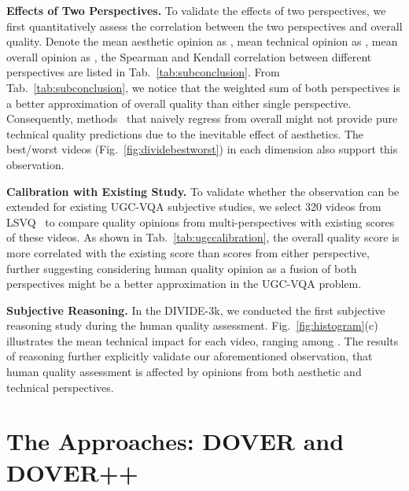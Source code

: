 \documentclass[10pt,twocolumn,letterpaper]{article}
\renewcommand{\paragraph}[1]{\noindent \textbf{#1}}
\newcommand{\blue}[1]{\textbf{\textcolor{mblue}{#1}}}
\newcommand{\green}[1]{\textcolor{mgreen}{#1}}
\begin{document}
\paragraph{Effects of Two Perspectives.} To validate the effects of two perspectives, we first quantitatively assess the correlation between the two perspectives and overall quality. Denote the mean aesthetic opinion as \blue{}, mean technical opinion as \green{}, mean overall opinion as , the Spearman and Kendall correlation between different perspectives are listed in Tab.~\ref{tab:subconclusion}. From Tab.~\ref{tab:subconclusion}, we notice that the weighted sum of both perspectives is a better approximation of overall quality than either single perspective. Consequently, methods~\cite{vsfa,bvqa2021,pvq} that naively regress from overall  might not provide pure technical quality predictions due to the inevitable effect of aesthetics. The best/worst videos (Fig.~\ref{fig:dividebestworst}) in each dimension also support this observation.

\paragraph{Calibration with Existing Study.} To validate whether the observation can be extended for existing UGC-VQA subjective studies, we select 320 videos from LSVQ~\cite{pvq} to compare quality opinions from multi-perspectives with existing scores of these videos. As shown in Tab.~\ref{tab:ugccalibration}, the overall quality score is more correlated with the existing score than scores from either perspective, further suggesting considering human quality opinion as a fusion of both perspectives might be a better approximation in the UGC-VQA problem.





\paragraph{Subjective Reasoning.} In the DIVIDE-3k, we conducted the first subjective reasoning study during the human quality assessment. Fig.~\ref{fig:histogram}(c) illustrates the mean technical impact for each video, ranging among . The results of reasoning further explicitly validate our aforementioned observation, that human quality assessment is affected by opinions from both aesthetic and technical perspectives.


\section{The Approaches: DOVER and DOVER++}
\label{sec:4}
\end{document}
